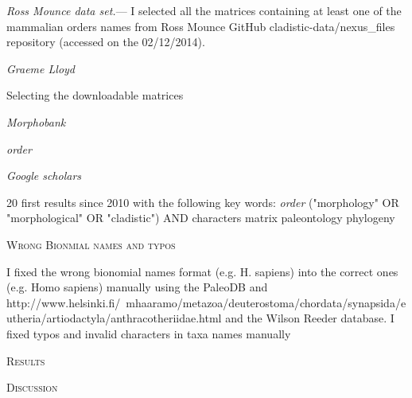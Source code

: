 \documentclass[12pt,letterpaper]{article}
\renewcommand{\section}[1]{%
\bigskip
\begin{center}
\begin{Large}
\normalfont\scshape #1
\medskip
\end{Large}
\end{center}}
\renewcommand{\subsection}[1]{%
\bigskip
\begin{center}
\begin{large}
\normalfont\itshape #1
\end{large}
\end{center}}
\renewcommand{\subsubsection}[1]{%
\vspace{2ex}
\noindent
\textit{#1.}---}
\begin{document}
\subsubsection{Ross Mounce data set}
I selected all the matrices containing at least one of the mammalian orders names from Ross Mounce GitHub cladistic-data/nexus_files repository (accessed on the 02/12/2014).

\subsection{Graeme Lloyd}
Selecting the downloadable matrices

\subsection{Morphobank}
\textit{order}

\subsection{Google scholars}
20 first results since 2010 with the following key words:
\textit{order} ("morphology" OR "morphological" OR "cladistic") AND characters matrix paleontology phylogeny

\section{Wrong Bionmial names and typos}
I fixed the wrong bionomial names format (e.g. H. sapiens) into the correct ones (e.g. Homo sapiens) manually using the PaleoDB and http://www.helsinki.fi/~mhaaramo/metazoa/deuterostoma/chordata/synapsida/eutheria/artiodactyla/anthracotheriidae.html and the Wilson Reeder database.
I fixed typos and invalid characters in taxa names manually

%
%

\section{Results}

%
%

\section{Discussion}
\end{document}

